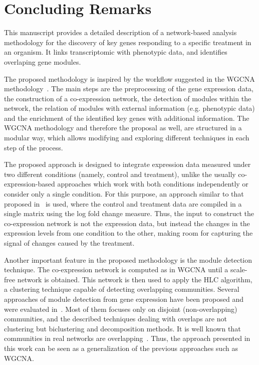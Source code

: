 \section{Concluding Remarks}
\label{sec.concl}

This manuscript provides a detailed description of a network-based analysis
methodology for the discovery of key genes responding to
a specific treatment in an organism. It links transcriptomic with
phenotypic data, and identifies overlaping gene modules.


The proposed methodology is inspired by the workflow suggested in the
WGCNA methodology~\cite{langfelder2008wgcna}. The main steps are the
preprocessing of the gene expression data, the construction of a
co-expression network, the detection of modules within the network,
the relation of modules with external information (e.g. phenotypic data)
and the enrichment of the identified key genes with additional information.
The WGCNA methodology and therefore the proposal as well, are structured
in a modular way, which allows modifying and  exploring different techniques
in each step of the process.


The proposed approach is designed to integrate expression data
measured under two different conditions (namely, control and treatment),
unlike the usually co-expression-based approaches which work with both
conditions independently or consider only a single condition. For this
purpose, an approach similar to that proposed in~\cite{du2019network}
is used, where the control and treatment data are compiled in a single
matrix using the log fold change measure. Thus, the input to construct
the co-expression network is not the expression data, but instead the changes
in the expression levels from one condition to the other, making room for capturing
the signal of changes caused by the treatment.


Another important feature in the proposed methodology is the module
detection technique. The co-expression network is computed as in
WGCNA until a scale-free network is obtained. This network is then
used to apply the HLC algorithm, a clustering technique capable of
detecting overlapping communities. Several approaches of module
detection from gene expression have been proposed and were evaluated
in~\cite{saelens2018comprehensive}. Most of them focuses only on
disjoint (non-overlapping) communities, and the described techniques
dealing with overlaps are not clustering but biclustering and
decomposition methods. It is well known that communities in real
networks are overlapping~\cite{palla2005uncovering}. Thus, the approach
presented in this work can be seen as a generalization of the previous 
approaches such as WGCNA.


